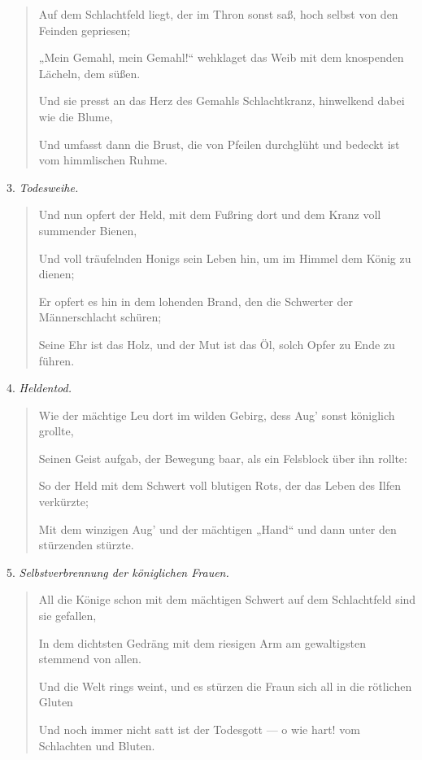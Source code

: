 \documentclass{article}
\begin{document}
\begin{quotation}\small
Auf dem Schlachtfeld liegt, der im Thron sonst saß, hoch selbst von den Feinden gepriesen;

„Mein Gemahl, mein Gemahl!“ wehklaget das Weib mit dem knospenden Lächeln, dem süßen.

Und sie presst an das Herz des Gemahls Schlachtkranz, hinwelkend dabei wie die Blume,

Und umfasst dann die Brust, die von Pfeilen durchglüht und bedeckt ist vom himmlischen Ruhme.
\end{quotation}
\begin{center}
3. \emph{Todesweihe.}
\end{center}
\begin{quotation}\small
Und nun opfert der Held, mit dem Fußring dort und dem Kranz voll summender Bienen,

Und voll träufelnden Honigs sein Leben hin, um im Himmel dem König zu dienen;

Er opfert es hin in dem lohenden Brand, den die Schwerter der Männerschlacht schüren;

Seine Ehr ist das Holz, und der Mut ist das Öl, solch Opfer zu Ende zu führen.
\end{quotation}
\begin{center}
4. \emph{Heldentod.}
\end{center}
\begin{quotation}\small
Wie der mächtige Leu dort im wilden Gebirg, dess Aug' sonst königlich grollte,

Seinen Geist aufgab, der Bewegung baar, als ein Felsblock über ihn rollte:

So der Held mit dem Schwert voll blutigen Rots, der das Leben des Ilfen verkürzte;

Mit dem winzigen Aug' und der mächtigen „Hand“ und dann unter den stürzenden stürzte.
\end{quotation}
\begin{center}
5. \emph{Selbstverbrennung der königlichen Frauen.}
\end{center}
\begin{quotation}\small
All die Könige schon mit dem mächtigen Schwert auf dem Schlachtfeld sind sie gefallen,

In dem dichtsten Gedräng mit dem riesigen Arm am gewaltigsten stemmend von allen.

Und die Welt rings weint, und es stürzen die Fraun sich all in die rötlichen Gluten

Und noch immer nicht satt ist der Todesgott — o wie hart! vom Schlachten und Bluten.
\end{quotation}
\end{document}
